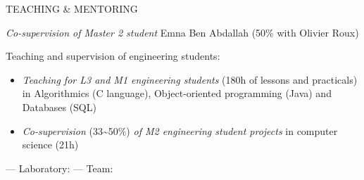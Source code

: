 \begin{cvsection}{TEACHING \& MENTORING}

{%
\emph{Co-supervision of Master 2 student} Emna Ben Abdallah (50\% with Olivier Roux)
\begin{itemize}
\end{itemize}
\smallskip
Teaching and supervision of engineering students:
\begin{itemize}
  \item \emph{Teaching for L3 and M1 engineering students} (180h of lessons and practicals) in
Algorithmics (C language), Object-oriented programming (Java) and Databases (SQL)
\item \emph{Co-supervision} (33\textasciitilde50\%) \emph{of M2 engineering student projects} in computer science (21h)
\end{itemize}
}
{}{
 --- Laboratory: 
 --- Team: }

\end{cvsection}
